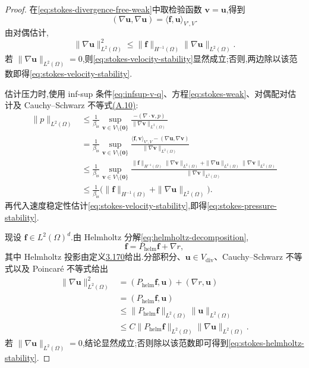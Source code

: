 \begin{proof}
在\cref{eq:stokes-divergence-free-weak}中取检验函数 $\bm{v}=\bm{u}$,得到
\[
  (\nabla\bm{u},\nabla\bm{u})
    =\langle\bm{f},\bm{u}\rangle_{V',V}.
\]
由对偶估计,
\[
  \|\nabla\bm{u}\|_{L^2(\Omega)}^2
    \leq\|\bm{f}\|_{H^{-1}(\Omega)}
         \|\nabla\bm{u}\|_{L^2(\Omega)}.
\]
若 $\|\nabla\bm{u}\|_{L^2(\Omega)}=0$,则\cref{eq:stokes-velocity-stability}显然成立;否则,两边除以该范数即得\cref{eq:stokes-velocity-stability}.

估计压力时,使用 inf-sup 条件\cref{eq:infsup-v-q}、方程\cref{eq:stokes-weak}、对偶配对估计及 Cauchy--Schwarz 不等式\hyperref[eq:appendix-a-10]{(A.10)}:
\[
\begin{aligned}
  \|p\|_{L^2(\Omega)}
   &\leq\frac{1}{\beta_{\mathrm{is}}}
       \sup_{\bm{v}\in V\setminus\{\bm{0}\}}
       \frac{-(\nabla\cdot\bm{v},p)}
            {\|\nabla\bm{v}\|_{L^2(\Omega)}}\\
   &=\frac{1}{\beta_{\mathrm{is}}}
       \sup_{\bm{v}\in V\setminus\{\bm{0}\}}
       \frac{\langle\bm{f},\bm{v}\rangle_{V',V}
                    -(\nabla\bm{u},\nabla\bm{v})}
            {\|\nabla\bm{v}\|_{L^2(\Omega)}}\\
   &\leq\frac{1}{\beta_{\mathrm{is}}}
       \sup_{\bm{v}\in V\setminus\{\bm{0}\}}
       \frac{\|\bm{f}\|_{H^{-1}(\Omega)}\|\nabla\bm{v}\|_{L^2(\Omega)}
             +\|\nabla\bm{u}\|_{L^2(\Omega)}
              \|\nabla\bm{v}\|_{L^2(\Omega)}}
            {\|\nabla\bm{v}\|_{L^2(\Omega)}}\\
   &\leq\frac{1}{\beta_{\mathrm{is}}}
       \bigl(\|\bm{f}\|_{H^{-1}(\Omega)}
            +\|\nabla\bm{u}\|_{L^2(\Omega)}\bigr).
\end{aligned}
\]
再代入速度稳定性估计\cref{eq:stokes-velocity-stability},即得\cref{eq:stokes-pressure-stability}.

现设 $\bm{f}\in L^2(\Omega)^d$.由 Helmholtz 分解\cref{eq:helmholtz-decomposition},
\[
  \bm{f}=P_{\mathrm{helm}}\bm{f}+\nabla r,
\]
其中 Helmholtz 投影由定义\hyperref[def:helmholtz-projection]{3.170}给出.分部积分、$\bm{u}\in V_{\mathrm{div}}$、Cauchy--Schwarz 不等式以及 Poincaré 不等式给出
\[
\begin{aligned}
  \|\nabla\bm{u}\|_{L^2(\Omega)}^2
   &=(P_{\mathrm{helm}}\bm{f},\bm{u})
       +(\nabla r,\bm{u})\\
   &=(P_{\mathrm{helm}}\bm{f},\bm{u})\\
   &\leq\|P_{\mathrm{helm}}\bm{f}\|_{L^2(\Omega)}
          \|\bm{u}\|_{L^2(\Omega)}\\
   &\leq C\|P_{\mathrm{helm}}\bm{f}\|_{L^2(\Omega)}
          \|\nabla\bm{u}\|_{L^2(\Omega)}.
\end{aligned}
\]
若 $\|\nabla\bm{u}\|_{L^2(\Omega)}=0$,结论显然成立;否则除以该范数即可得到\cref{eq:stokes-helmholtz-stability}.
\end{proof}

